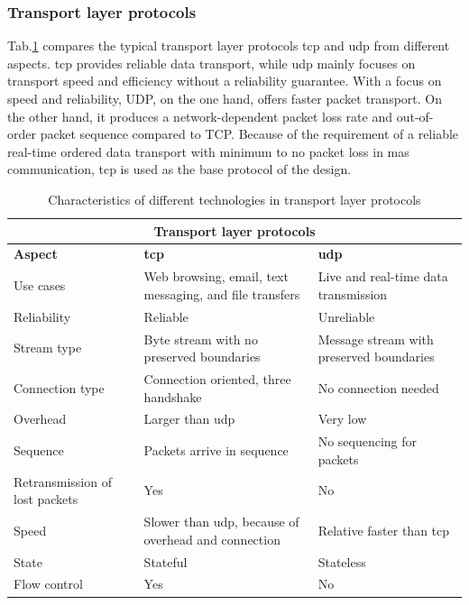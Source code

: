 \subsubsection{Transport layer protocols}

Tab.\ref{tab: transportlayer} compares the typical transport layer protocols \gls{tcp} 
and \gls{udp} from different aspects. \gls{tcp} provides reliable data 
transport, while \gls{udp} mainly focuses on transport speed and efficiency without a 
reliability guarantee. With a focus on speed and reliability, UDP, on the one hand, 
offers faster packet
transport. On the other hand, it produces a network-dependent packet loss rate and 
out-of-order packet sequence compared to TCP. Because of the requirement of a 
reliable real-time ordered data transport with minimum to no packet loss in \gls{mas} 
communication, \gls{tcp} is used as the base protocol of the design.

\begin{table}[htbp]
    \small
    \centering
    \caption{Characteristics of different technologies in transport layer protocols}
    \label{tab: transportlayer}
    \begin{tabular}{|m{}|m{}|m{}|}
    \hline
    \multicolumn{3}{|c|}{\textbf{Transport layer protocols}}                                                            \\ \hline
    \textbf{Aspect}                         & \textbf{\gls{tcp}}             & \textbf{\gls{udp}}        \\ \hline
    Use cases                      & Web browsing, email, text messaging, and file transfers & Live and real-time data transmission \\ \hline
    Reliability                    & Reliable        & Unreliable \\ \hline
    Stream type                    & Byte stream with no preserved boundaries & Message stream with preserved boundaries \\ \hline
    Connection type                & Connection oriented, three handshake & No connection needed \\ \hline
    Overhead                       & Larger than \gls{udp} & Very low   \\ \hline
    Sequence                       & Packets arrive in sequence & No sequencing for packets \\ \hline
    Retransmission of lost packets & Yes             & No         \\ \hline
    Speed                          & Slower than \gls{udp}, because of overhead and connection & Relative faster than \gls{tcp} \\ \hline
    State                          & Stateful        & Stateless  \\ \hline
    Flow control                   & Yes             & No         \\ \hline
    \end{tabular}
\end{table}





